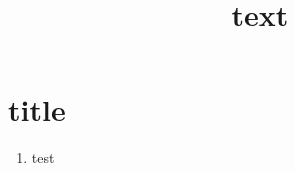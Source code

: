 \documentclass{beamer}
\title{text}
\begin{document}
\begin{frame}
\titlepage
\end{frame} 

\section{title}
\begin{frame}
    \begin{enumerate}
    \item test
    \end{enumerate}
\end{frame} 
\end{document}
